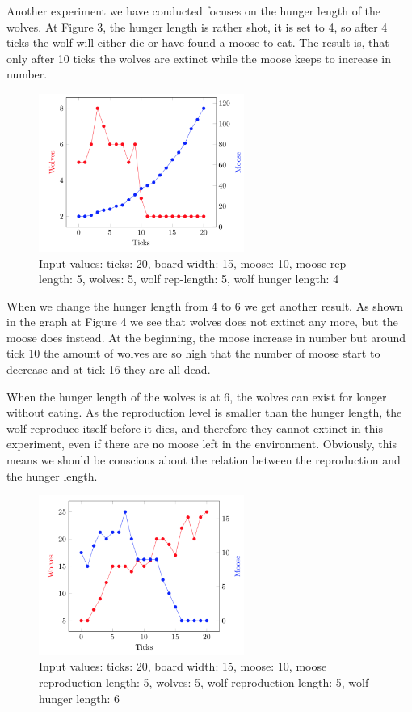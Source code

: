 \documentclass[a4paper]{report}
\begin{document}
Another experiment we have conducted focuses on the hunger length of the wolves. At Figure 3, the hunger length is rather shot, it is set to 4, so after 4 ticks the wolf will either die or have found a moose to eat. The result is, that only after 10 ticks the wolves are extinct while the moose keeps to increase in number.
\begin{figure}[H]
\centering
\includegraphics[width=0.60\textwidth]{Experiments/sim_hunlen_a1}
\caption{Input values: ticks: 20, board width: 15, moose: 10, moose rep-length: 5, wolves: 5, wolf rep-length: 5, wolf hunger length: 4}
\end{figure}

When we change the hunger length from 4 to 6 we get another result. As shown in the graph at Figure 4 we see that wolves does not extinct any more, but the moose does instead. At the beginning, the moose increase in number but around tick 10 the amount of wolves are so high that the number of moose start to decrease and at tick 16 they are all dead.

When the hunger length of the wolves is at 6, the wolves can exist for longer without eating. As the reproduction level is smaller than the hunger length, the wolf reproduce itself before it dies, and therefore they cannot extinct in this experiment, even if there are no moose left in the environment. Obviously, this means we should be conscious about the relation between the reproduction and the hunger length.

\begin{figure}[H]
\centering
\includegraphics[width=0.60\textwidth]{Experiments/sim_hunlen_a2}
\caption{Input values: ticks: 20, board width: 15, moose: 10, moose reproduction length: 5, wolves: 5, wolf reproduction length: 5, wolf hunger length: 6}
\end{figure}
\end{document}
